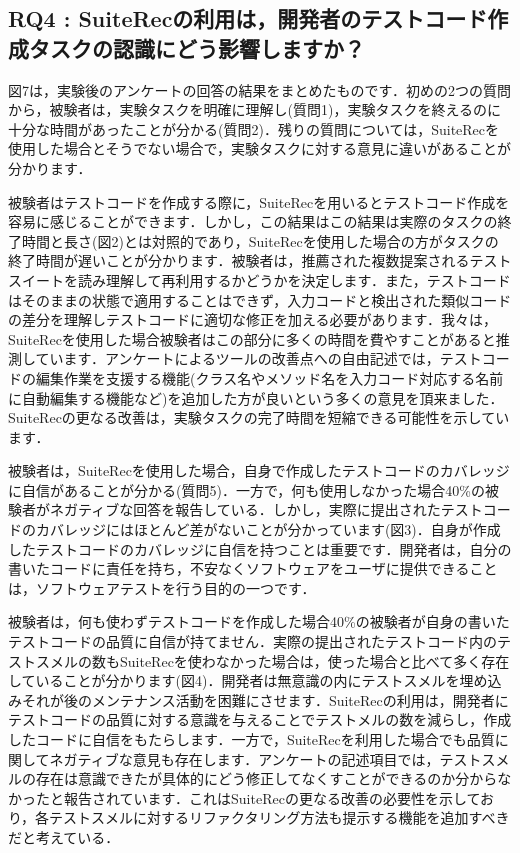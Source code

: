 \documentclass[conference]{IEEEtran}
\begin{document}
\subsection{RQ4 : SuiteRecの利用は，開発者のテストコード作成タスクの認識にどう影響しますか？}

図7は，実験後のアンケートの回答の結果をまとめたものです．初めの2つの質問から，被験者は，実験タスクを明確に理解し(質問1)，実験タスクを終えるのに十分な時間があったことが分かる(質問2)．残りの質問については，SuiteRecを使用した場合とそうでない場合で，実験タスクに対する意見に違いがあることが分かります．

被験者はテストコードを作成する際に，SuiteRecを用いるとテストコード作成を容易に感じることができます．しかし，この結果はこの結果は実際のタスクの終了時間と長さ(図2)とは対照的であり，SuiteRecを使用した場合の方がタスクの終了時間が遅いことが分かります．被験者は，推薦された複数提案されるテストスイートを読み理解して再利用するかどうかを決定します．また，テストコードはそのままの状態で適用することはできず，入力コードと検出された類似コードの差分を理解しテストコードに適切な修正を加える必要があります．我々は，SuiteRecを使用した場合被験者はこの部分に多くの時間を費やすことがあると推測しています．アンケートによるツールの改善点への自由記述では，テストコードの編集作業を支援する機能(クラス名やメソッド名を入力コード対応する名前に自動編集する機能など)を追加した方が良いという多くの意見を頂来ました．SuiteRecの更なる改善は，実験タスクの完了時間を短縮できる可能性を示しています．

被験者は，SuiteRecを使用した場合，自身で作成したテストコードのカバレッジに自信があることが分かる(質問5)．一方で，何も使用しなかった場合40\%の被験者がネガティブな回答を報告している．しかし，実際に提出されたテストコードのカバレッジにはほとんど差がないことが分かっています(図3)．自身が作成したテストコードのカバレッジに自信を持つことは重要です．開発者は，自分の書いたコードに責任を持ち，不安なくソフトウェアをユーザに提供できることは，ソフトウェアテストを行う目的の一つです．

被験者は，何も使わずテストコードを作成した場合40\%の被験者が自身の書いたテストコードの品質に自信が持てません．実際の提出されたテストコード内のテストスメルの数もSuiteRecを使わなかった場合は，使った場合と比べて多く存在していることが分かります(図4)．開発者は無意識の内にテストスメルを埋め込みそれが後のメンテナンス活動を困難にさせます．SuiteRecの利用は，開発者にテストコードの品質に対する意識を与えることでテストメルの数を減らし，作成したコードに自信をもたらします．一方で，SuiteRecを利用した場合でも品質に関してネガティブな意見も存在します．アンケートの記述項目では，テストスメルの存在は意識できたが具体的にどう修正してなくすことができるのか分からなかったと報告されています．これはSuiteRecの更なる改善の必要性を示しており，各テストスメルに対するリファクタリング方法も提示する機能を追加すべきだと考えている．
\end{document}
